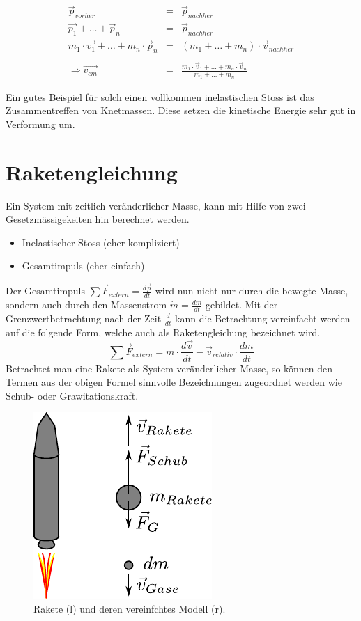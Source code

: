 \[ \boxed{
	\begin{array}{rcl}
		\vec{p}_{vorher} &= & \vec{p}_{nachher} \\
		\vec{p_1} + \dots + \vec{p}_n &= &\vec{p}_{nachher} \\
		m_1 \cdot \vec{v_1} + \dots + m_n \cdot \vec{p}_n&= 
			& (m_1 + \dots + m_n)\cdot \vec{v}_{nachher} \\
		 & & \\
		\Rightarrow \vec{v_{cm}} & = & \displaystyle 
			\frac{m_1\cdot\vec{v}_1+\dots+m_n\cdot\vec{v}_n}
				{m_1 + \dots + m_n}
	\end{array}
} \]

\noindent
Ein gutes Beispiel für solch einen vollkommen inelastischen Stoss ist
das Zusammentreffen von Knetmassen. Diese setzen die kinetische Energie
sehr gut in Verformung um.

\section{Raketengleichung}\label{sec:raketengleichung}
Ein System mit zeitlich veränderlicher Masse, kann mit Hilfe von zwei
Gesetzmässigekeiten hin berechnet werden.
\begin{itemize}
	\item Inelastischer Stoss (eher kompliziert)
	\item Gesamtimpuls (eher einfach)
\end{itemize}
Der Gesamtimpuls $\sum \vec{F}_{extern} = \frac{d\vec{p}}{dt}$ wird nun
nicht nur durch die bewegte Masse, sondern auch durch den Massenstrom 
$\dot{m}=\frac{dm}{dt}$ gebildet. 
Mit der Grenzwertbetrachtung nach der Zeit $\frac{d}{dt}$ kann die
Betrachtung vereinfacht werden auf die folgende Form, welche auch
als Raketengleichung bezeichnet wird.
\[  \boxed{
	\sum \vec{F}_{extern} 
		= m \cdot \frac{d\vec{v}}{dt} 
		- \vec{v}_{relativ} \cdot \frac{dm}{dt}
	} \]
Betrachtet man eine Rakete als System veränderlicher Masse, so können 
den Termen aus der obigen Formel sinnvolle Bezeichnungen zugeordnet 
werden wie Schub- oder Grawitationskraft.
\begin{figure}[h!]
	\centering
	\includegraphics[scale=0.8]{rakete.pdf}
	\caption{Rakete (l) und deren vereinfchtes Modell (r).}
	\label{fig:rakete}
\end{figure}

